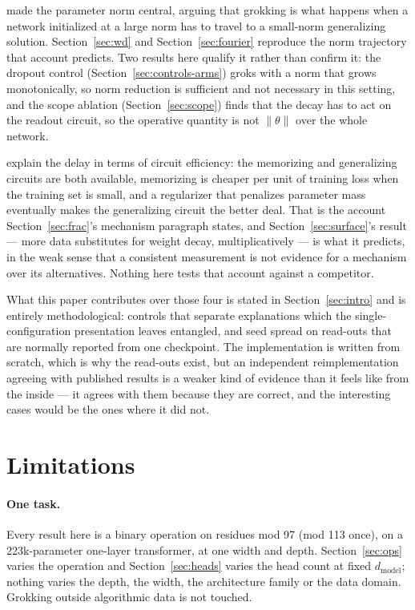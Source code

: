 \documentclass[11pt]{article}
\begin{document}
\citet{liu2023omnigrok} made the parameter norm central, arguing that grokking
is what happens when a network initialized at a large norm has to travel to a
small-norm generalizing solution. Section~\ref{sec:wd} and
Section~\ref{sec:fourier} reproduce the norm trajectory that account predicts.
Two results here qualify it rather than confirm it: the dropout control
(Section~\ref{sec:controls-arms}) groks with a norm that grows monotonically,
so norm reduction is sufficient and not necessary in this setting, and the
scope ablation (Section~\ref{sec:scope}) finds that the decay has to act on the
readout circuit, so the operative quantity is not $\lVert\theta\rVert$ over the
whole network.

\citet{varma2023efficiency} explain the delay in terms of circuit efficiency:
the memorizing and generalizing circuits are both available, memorizing is
cheaper per unit of training loss when the training set is small, and a
regularizer that penalizes parameter mass eventually makes the generalizing
circuit the better deal. That is the account Section~\ref{sec:frac}'s mechanism
paragraph states, and Section~\ref{sec:surface}'s result --- more data
substitutes for weight decay, multiplicatively --- is what it predicts, in the
weak sense that a consistent measurement is not evidence for a mechanism over
its alternatives. Nothing here tests that account against a competitor.

What this paper contributes over those four is stated in
Section~\ref{sec:intro} and is entirely methodological: controls that separate
explanations which the single-configuration presentation leaves entangled, and
seed spread on read-outs that are normally reported from one checkpoint. The
implementation is written from scratch, which is why the read-outs exist, but
an independent reimplementation agreeing with published results is a weaker
kind of evidence than it feels like from the inside --- it agrees with them
because they are correct, and the interesting cases would be the ones where it
did not.

\section{Limitations}
\label{sec:limitations}

\paragraph{One task.} Every result here is a binary operation on residues mod
97 (mod 113 once), on a 223k-parameter one-layer transformer, at one width and
depth. Section~\ref{sec:ops} varies the operation and Section~\ref{sec:heads}
varies the head count at fixed $d_{\text{model}}$; nothing varies the depth,
the width, the architecture family or the data domain. Grokking outside
algorithmic data \citep{liu2023omnigrok} is not touched.
\end{document}
